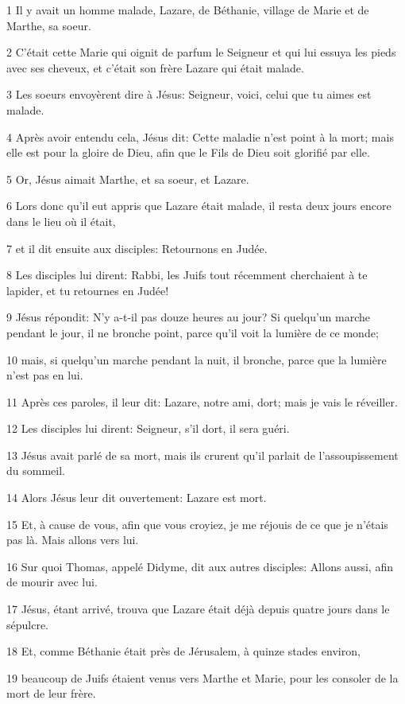 \par 1 Il y avait un homme malade, Lazare, de Béthanie, village de Marie et de Marthe, sa soeur.
\par 2 C'était cette Marie qui oignit de parfum le Seigneur et qui lui essuya les pieds avec ses cheveux, et c'était son frère Lazare qui était malade.
\par 3 Les soeurs envoyèrent dire à Jésus: Seigneur, voici, celui que tu aimes est malade.
\par 4 Après avoir entendu cela, Jésus dit: Cette maladie n'est point à la mort; mais elle est pour la gloire de Dieu, afin que le Fils de Dieu soit glorifié par elle.
\par 5 Or, Jésus aimait Marthe, et sa soeur, et Lazare.
\par 6 Lors donc qu'il eut appris que Lazare était malade, il resta deux jours encore dans le lieu où il était,
\par 7 et il dit ensuite aux disciples: Retournons en Judée.
\par 8 Les disciples lui dirent: Rabbi, les Juifs tout récemment cherchaient à te lapider, et tu retournes en Judée!
\par 9 Jésus répondit: N'y a-t-il pas douze heures au jour? Si quelqu'un marche pendant le jour, il ne bronche point, parce qu'il voit la lumière de ce monde;
\par 10 mais, si quelqu'un marche pendant la nuit, il bronche, parce que la lumière n'est pas en lui.
\par 11 Après ces paroles, il leur dit: Lazare, notre ami, dort; mais je vais le réveiller.
\par 12 Les disciples lui dirent: Seigneur, s'il dort, il sera guéri.
\par 13 Jésus avait parlé de sa mort, mais ils crurent qu'il parlait de l'assoupissement du sommeil.
\par 14 Alors Jésus leur dit ouvertement: Lazare est mort.
\par 15 Et, à cause de vous, afin que vous croyiez, je me réjouis de ce que je n'étais pas là. Mais allons vers lui.
\par 16 Sur quoi Thomas, appelé Didyme, dit aux autres disciples: Allons aussi, afin de mourir avec lui.
\par 17 Jésus, étant arrivé, trouva que Lazare était déjà depuis quatre jours dans le sépulcre.
\par 18 Et, comme Béthanie était près de Jérusalem, à quinze stades environ,
\par 19 beaucoup de Juifs étaient venus vers Marthe et Marie, pour les consoler de la mort de leur frère.
